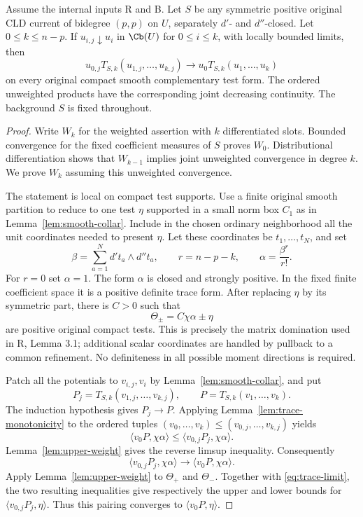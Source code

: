 \begin{theorem}
\label{thm:relative-monotone}
Assume the internal inputs \textup{R} and \textup{B}. Let $S$ be any
symmetric positive original CLD current of bidegree $(p,p)$ on $U$,
separately $d'$- and $d''$-closed. Let $0\leq k\leq n-p$.
If $u_{i,j}\downarrow u_i$ in $\Cb(U)$ for $0\leq i\leq k$, with
locally bounded limits, then
\[
 u_{0,j}T_{S,k}(u_{1,j},\ldots,u_{k,j})
 \longrightarrow
 u_0T_{S,k}(u_1,\ldots,u_k)
\]
on every original compact smooth complementary test form. The ordered
unweighted products have the corresponding joint decreasing continuity.
The background $S$ is fixed throughout.
\end{theorem}

\begin{proof}
Write $W_k$ for the weighted assertion with $k$ differentiated slots.
Bounded convergence for the fixed coefficient measures of $S$ proves
$W_0$. Distributional differentiation shows that $W_{k-1}$ implies
joint unweighted convergence in degree $k$. We prove $W_k$ assuming
this unweighted convergence.

The statement is local on compact test supports. Use a finite original
smooth partition to reduce to one test $\eta$ supported in a small
norm box $C_1$ as in Lemma~\ref{lem:smooth-collar}. Include in the chosen
ordinary neighborhood all the unit coordinates needed to present
$\eta$. Let these coordinates be $t_1,\ldots,t_N$, and set
\[
 \beta=\sum_{a=1}^N d't_a\wedge d''t_a,
 \qquad r=n-p-k,\qquad \alpha=\frac{\beta^r}{r!}.
\]
For $r=0$ set $\alpha=1$. The form $\alpha$ is closed and strongly
positive. In the fixed finite coefficient space it is a positive
definite trace form. After replacing $\eta$ by its symmetric part,
there is $C>0$ such that
\[
 \Theta_\pm=C\chi\alpha\pm\eta
\]
are positive original compact tests. This is precisely the matrix
domination used in \textup{R}, Lemma 3.1; additional scalar coordinates
are handled by pullback to a common refinement. No definiteness in
all possible moment directions is required.

Patch all the potentials to $v_{i,j},v_i$ by
Lemma~\ref{lem:smooth-collar}, and put
\[
 P_j=T_{S,k}(v_{1,j},\ldots,v_{k,j}),\qquad
 P=T_{S,k}(v_1,\ldots,v_k).
\]
The induction hypothesis gives $P_j\to P$. Applying
Lemma~\ref{lem:trace-monotonicity} to the ordered tuples
$(v_0,\ldots,v_k)\leq(v_{0,j},\ldots,v_{k,j})$ yields
\[
 \langle v_0P,\chi\alpha\rangle
       \leq\langle v_{0,j}P_j,\chi\alpha\rangle.
\]
Lemma~\ref{lem:upper-weight} gives the reverse limsup inequality.
Consequently
\begin{equation}
 \label{eq:trace-limit}
 \langle v_{0,j}P_j,\chi\alpha\rangle
       \longrightarrow\langle v_0P,\chi\alpha\rangle.
\end{equation}
Apply Lemma~\ref{lem:upper-weight} to $\Theta_+$ and $\Theta_-$.
Together with \eqref{eq:trace-limit}, the two resulting inequalities
give respectively the upper and lower bounds for
$\langle v_{0,j}P_j,\eta\rangle$. Thus this pairing converges to
$\langle v_0P,\eta\rangle$.


\end{proof}
